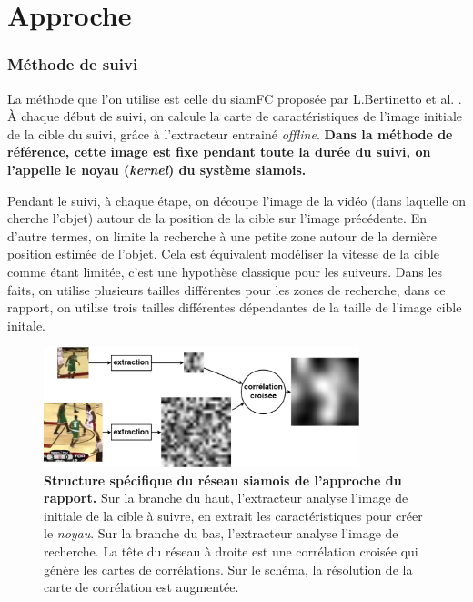 \documentclass[10pt,twocolumn,letterpaper,french]{article}
\begin{document}
\section*{Approche}


\subsubsection*{Méthode de suivi}


La méthode que l'on utilise est celle du siamFC proposée par L.Bertinetto et al. \cite{siamfc}. À chaque début de suivi, on calcule la carte de caractéristiques de l'image initiale de la cible du suivi, grâce à l'extracteur entrainé \textit{offline}. \textbf{Dans la méthode de référence, cette image est fixe pendant toute la durée du suivi, on l'appelle le noyau (\textit{kernel}) du système siamois.}

Pendant le suivi, à chaque étape, on découpe l'image de la vidéo (dans laquelle on cherche l'objet) autour de la position de la cible sur l'image précédente. En d'autre termes, on limite la recherche à une petite zone autour de la dernière position estimée de l'objet. Cela est équivalent modéliser la vitesse de la cible comme étant limitée, c'est une hypothèse classique pour les suiveurs. Dans les faits, on utilise plusieurs tailles différentes pour les zones de recherche, dans ce rapport, on utilise trois tailles différentes dépendantes de la taille de l'image cible initale.

\begin{figure}[!h]
  \centering
  \includegraphics[width=260pt]{images/vids/basket/cross.png}
  \caption{\textbf{Structure spécifique du réseau siamois de l'approche du rapport.} Sur la branche du haut, l'extracteur analyse l'image de initiale de la cible à suivre, en extrait les caractéristiques pour créer le \textit{noyau}. Sur la branche du bas, l'extracteur analyse l'image de recherche. La tête du réseau à droite est une corrélation croisée qui génère les cartes de corrélations. Sur le schéma, la résolution de la carte de corrélation est augmentée.}
  \label{strucutre}
  \end{figure}
\end{document}
